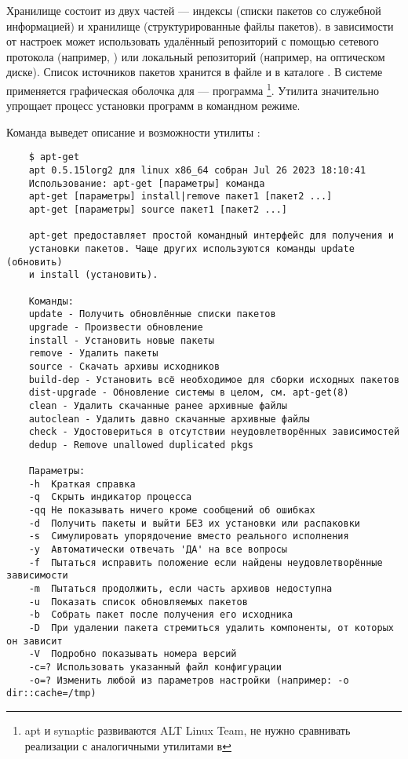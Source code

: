 Хранилище состоит из двух частей --- индексы (списки пакетов со служебной информацией) и
хранилище (структурированные файлы пакетов).
 в зависимости от настроек может использовать удалённый репозиторий
с помощью сетевого протокола (например, ) или локальный репозиторий (например,
на оптическом диске).
Список источников пакетов хранится в файле
 и в каталоге . В системе 
применяется графическая оболочка для  --- программа \footnote{apt и synaptic
	развиваются ALT Linux Team, не нужно сравнивать реализации с аналогичными утилитами в }.
Утилита  значительно упрощает процесс установки программ в командном режиме.


Команда  выведет описание и возможности утилиты :
\begin{verbatim}
	$ apt-get
	apt 0.5.15lorg2 для linux x86_64 собран Jul 26 2023 18:10:41
	Использование: apt-get [параметры] команда
	apt-get [параметры] install|remove пакет1 [пакет2 ...]
	apt-get [параметры] source пакет1 [пакет2 ...]
	
	apt-get предоставляет простой командный интерфейс для получения и
	установки пакетов. Чаще других используются команды update (обновить)
	и install (установить).
	
	Команды:
	update - Получить обновлённые списки пакетов
	upgrade - Произвести обновление
	install - Установить новые пакеты
	remove - Удалить пакеты
	source - Скачать архивы исходников
	build-dep - Установить всё необходимое для сборки исходных пакетов
	dist-upgrade - Обновление системы в целом, см. apt-get(8)
	clean - Удалить скачанные ранее архивные файлы
	autoclean - Удалить давно скачанные архивные файлы
	check - Удостовериться в отсутствии неудовлетворённых зависимостей
	dedup - Remove unallowed duplicated pkgs
	
	Параметры:
	-h  Краткая справка
	-q  Скрыть индикатор процесса
	-qq Не показывать ничего кроме сообщений об ошибках
	-d  Получить пакеты и выйти БЕЗ их установки или распаковки
	-s  Симулировать упорядочение вместо реального исполнения
	-y  Автоматически отвечать 'ДА' на все вопросы
	-f  Пытаться исправить положение если найдены неудовлетворённые зависимости
	-m  Пытаться продолжить, если часть архивов недоступна
	-u  Показать список обновляемых пакетов
	-b  Собрать пакет после получения его исходника
	-D  При удалении пакета стремиться удалить компоненты, от которых он зависит
	-V  Подробно показывать номера версий
	-c=? Использовать указанный файл конфигурации
	-o=? Изменить любой из параметров настройки (например: -o dir::cache=/tmp)
\end{verbatim}

